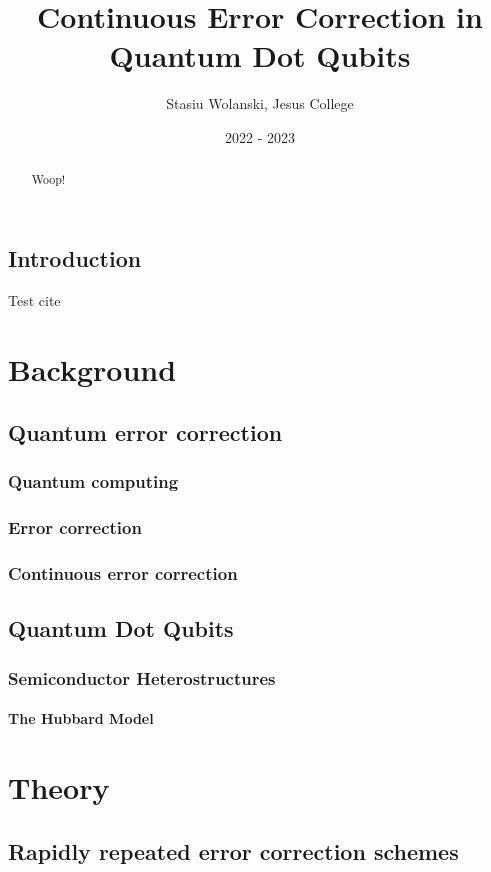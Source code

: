 \documentclass{report}
\title{Continuous Error Correction in Quantum Dot Qubits}
\author{Stasiu Wolanski, Jesus College}
\date{2022 - 2023}
\begin{document}
\maketitle

\begin{abstract}
    Woop!
\end{abstract}

\tableofcontents

\section{Introduction}
Test cite \cite{einstein}
\chapter{Background}

\section{Quantum error correction}
\subsection{Quantum computing}
\subsection{Error correction}
\subsection{Continuous error correction}


\section{Quantum Dot Qubits}
\subsection{Semiconductor Heterostructures}
\subsubsection{The Hubbard Model}

\chapter{Theory}

\section{Rapidly repeated error correction schemes}
\end{document}
